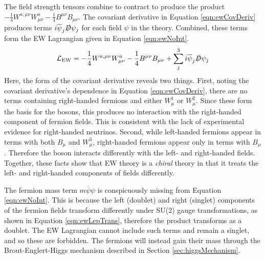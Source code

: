 The field strength tensors combine to contract to produce the product $-\frac{1}{4}W^{a,\mu\nu}W^{a}_{\mu\nu}-\frac{1}{4}B^{\mu\nu}B_{\mu\nu}$.
The covariant derivative in Equation \ref{eqn:ewCovDeriv} produces terms $i\overline{\psi}_j\slashed{D}\psi_j$ for each field $\psi$ in the theory.
Combined, these terms form the EW Lagrangian given in Equation \ref{eqn:ewNoInt}.
\begin{equation}\begin{split}\label{eqn:ewNoInt}
\mathcal{L}_\text{EW} = -\frac{1}{4}W^{a,\mu\nu}W^{a}_{\mu\nu}- \frac{1}{4}B^{\mu\nu}B_{\mu\nu}+ \sum_j^3 i\overline{\psi}_j\slashed{D}\psi_j
\end{split}\end{equation}
Here, the form of the covariant derivative reveals two things.
First, noting the covariant derivative's dependence in Equation \ref{eqn:ewCovDeriv}, there are no terms containing right-handed fermions and either $W^1_\mu$ or $W^2_\mu$.
Since these form the basis for the \W bosons, this produces no interaction with the right-handed component of fermion fields.
This is consistent with the lack of experimental evidence for right-handed neutrinos.
Second, while left-handed fermions appear in terms with both $B_\mu$ and $W^3_\mu$, right-handed fermions appear only in terms with $B_\mu$. Therefore the \Z boson interacts differently with the left- and right-handed fields.
Together, these facts show that EW theory is a \emph{chiral} theory in that it treats the left- and right-handed components of fields differently.

The fermion mass term $m\overline{\psi}\psi$ is conspicuously missing from Equation \ref{eqn:ewNoInt}.
This is because the left (doublet) and right (singlet) components of the fermion fields transform differently under SU(2) gauge transformations, as shown in Equation \ref{eqn:ewLepTrans}, therefore the product transforms as a doublet.
The EW Lagrangian cannot include such terms and remain a singlet, and so these are forbidden.
The fermions will instead gain their mass through the Brout-Englert-Higgs mechanism described in Section \ref{sec:higgsMechanism}.


